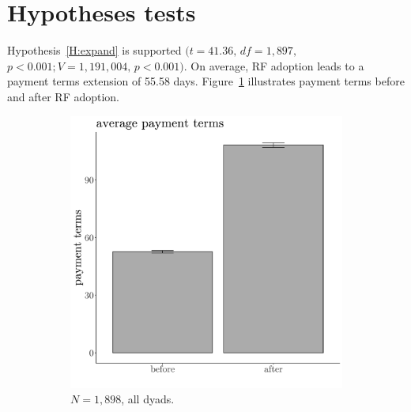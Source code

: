 \documentclass[a4paper,11pt]{article}
\renewcommand{\~}[1]{\tilde{#1}}
\renewcommand{\-}[1]{\overline{#1}}
\begin{document}
\section{Hypotheses tests}\label{sec:dataAnalysis}
Hypothesis~\ref{H:expand} is supported  $\big(t=41.36,\,df=1,897,$ $p<0.001; V=1,191,004,\,p<0.001\big)$. On average, RF adoption leads to a payment terms extension of 55.58 days. Figure~\ref{fig:bar.pt} illustrates payment terms before and after RF adoption.

\begin{figure}[htb]
      \begin{subfigure}[b]{0.47\textwidth}
         \centering
         \includegraphics[width=\textwidth]{figures/bar.chart.payment.terms.pdf}
         \caption{$N=1,898$, all dyads. \vspace{24pt}}
         \label{fig:bar.pt}
     \end{subfigure}\hfill
     \begin{subfigure}[b]{0.47\textwidth}
        \centering

\end{subfigure}
\end{figure}
\end{document}
